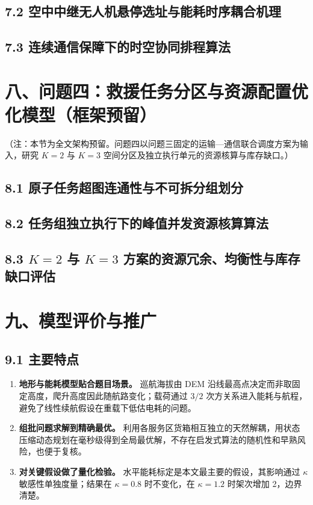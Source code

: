 \documentclass[withoutpreface,bwprint]{format}
\begin{document}
\subsection{7.2 空中中继无人机悬停选址与能耗时序耦合机理}
\subsection{7.3 连续通信保障下的时空协同排程算法}



\section{八、问题四：救援任务分区与资源配置优化模型（框架预留）}
{\kaishu （注：本节为全文架构预留。问题四以问题三固定的运输—通信联合调度方案为输入，研究 $K=2$ 与 $K=3$ 空间分区及独立执行单元的资源核算与库存缺口。）}

\subsection{8.1 原子任务超图连通性与不可拆分组划分}
\subsection{8.2 任务组独立执行下的峰值并发资源核算算法}
\subsection{\texorpdfstring{8.3 $K=2$ 与 $K=3$ 方案的资源冗余、均衡性与库存缺口评估}{8.3 K=2 与 K=3 方案的资源冗余、均衡性与库存缺口评估}}



\section{九、模型评价与推广}

\subsection{9.1 主要特点}
\begin{enumerate}[leftmargin=*]
    \item \textbf{地形与能耗模型贴合题目场景。} 巡航海拔由 DEM 沿线最高点决定而非取固定高度，爬升高度因此随航路变化；载荷通过 $3/2$ 次方关系进入能耗与航程，避免了线性续航假设在重载下低估电耗的问题。
    \item \textbf{组批问题求解到精确最优。} 利用各服务区货箱相互独立的天然解耦，用状态压缩动态规划在毫秒级得到全局最优解，不存在启发式算法的随机性和早熟风险，也便于复核。
    \item \textbf{对关键假设做了量化检验。} 水平能耗标定是本文最主要的假设，其影响通过 $\kappa$ 敏感性单独度量；结果在 $\kappa=0.8$ 时不变化，在 $\kappa=1.2$ 时架次增加 2，边界清楚。
\end{enumerate}
\end{document}
